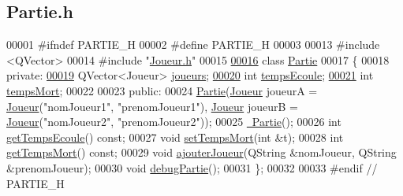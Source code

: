 \hypertarget{_partie_8h_source}{}\subsection{Partie.\+h}

\begin{DoxyCode}
00001 \textcolor{preprocessor}{#ifndef PARTIE\_H}
00002 \textcolor{preprocessor}{#define PARTIE\_H}
00003 
00013 \textcolor{preprocessor}{#include <QVector>}
00014 \textcolor{preprocessor}{#include "\hyperlink{_joueur_8h}{Joueur.h}"}
00015 
\hyperlink{class_partie}{00016} \textcolor{keyword}{class }\hyperlink{class_partie}{Partie}
00017 \{
00018 \textcolor{keyword}{private}:
\hyperlink{class_partie_a98fa2810599b3eb46d57df2b5836a3f4}{00019}     QVector<Joueur> \hyperlink{class_partie_a98fa2810599b3eb46d57df2b5836a3f4}{joueurs};
\hyperlink{class_partie_a58664212ddb4954a59298f1de8256477}{00020}     \textcolor{keywordtype}{int} \hyperlink{class_partie_a58664212ddb4954a59298f1de8256477}{tempsEcoule};
\hyperlink{class_partie_a55a5e6e0b757d74fa9aceefa7228ead9}{00021}     \textcolor{keywordtype}{int} \hyperlink{class_partie_a55a5e6e0b757d74fa9aceefa7228ead9}{tempsMort};
00022 
00023 \textcolor{keyword}{public}:
00024     \hyperlink{class_partie_ae1a2da8080f9f51bdd7e9d864080444c}{Partie}(\hyperlink{class_joueur}{Joueur} joueurA = \hyperlink{class_joueur}{Joueur}(\textcolor{stringliteral}{"nomJoueur1"}, \textcolor{stringliteral}{"prenomJoueur1"}), 
      \hyperlink{class_joueur}{Joueur} joueurB = \hyperlink{class_joueur}{Joueur}(\textcolor{stringliteral}{"nomJoueur2"}, \textcolor{stringliteral}{"prenomJoueur2"}));
00025     \hyperlink{class_partie_ae4afeb7336bb84427272cfb7018b5e3d}{~Partie}();
00026     \textcolor{keywordtype}{int} \hyperlink{class_partie_ab5bb77bcbdb9a145016ebb4ff2bf6c38}{getTempsEcoule}() \textcolor{keyword}{const};
00027     \textcolor{keywordtype}{void} \hyperlink{class_partie_a4c9c799ba4057c15c0600bdf8b7f296f}{setTempsMort}(\textcolor{keywordtype}{int} &t);
00028     \textcolor{keywordtype}{int} \hyperlink{class_partie_ad78c6daffd7a676ce6c0a8e511991a75}{getTempsMort}() \textcolor{keyword}{const};
00029     \textcolor{keywordtype}{void} \hyperlink{class_partie_ab9900d3b66d9ac7eabc837c790faa6b8}{ajouterJoueur}(QString &nomJoueur, QString &prenomJoueur);
00030     \textcolor{keywordtype}{void} \hyperlink{class_partie_aea05906078462b32bf08a3172ab14328}{debugPartie}();
00031 \};
00032 
00033 \textcolor{preprocessor}{#endif // PARTIE\_H}
\end{DoxyCode}
